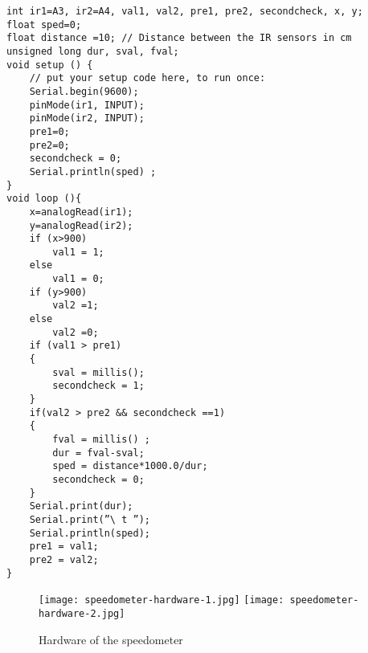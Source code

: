 \begin{lstlisting}[language=Arduino, numbers=none, caption={Arduino code for measuring the speed of a moving object},captionpos=b, label=list:speed]
int ir1=A3, ir2=A4, val1, val2, pre1, pre2, secondcheck, x, y;
float sped=0;
float distance =10; // Distance between the IR sensors in cm
unsigned long dur, sval, fval;
void setup () {
    // put your setup code here, to run once:
    Serial.begin(9600);
    pinMode(ir1, INPUT);
    pinMode(ir2, INPUT);
    pre1=0;
    pre2=0;
    secondcheck = 0;
    Serial.println(sped) ;
}
void loop (){
    x=analogRead(ir1);
    y=analogRead(ir2);  
    if (x>900)
        val1 = 1;
    else
        val1 = 0;
    if (y>900)
        val2 =1;
    else
        val2 =0;
    if (val1 > pre1)
    {
        sval = millis();
        secondcheck = 1;
    }
    if(val2 > pre2 && secondcheck ==1)
    {
        fval = millis() ;
        dur = fval-sval;
        sped = distance*1000.0/dur;
        secondcheck = 0;
    }
    Serial.print(dur);
    Serial.print(”\ t ”);
    Serial.println(sped);
    pre1 = val1;
    pre2 = val2;
}

\end{lstlisting}

\begin{figure}[H]
\centering
\texttt{[image: speedometer-hardware-1.jpg]}
\texttt{[image: speedometer-hardware-2.jpg]}
\caption{Hardware of the speedometer}
\end{figure}